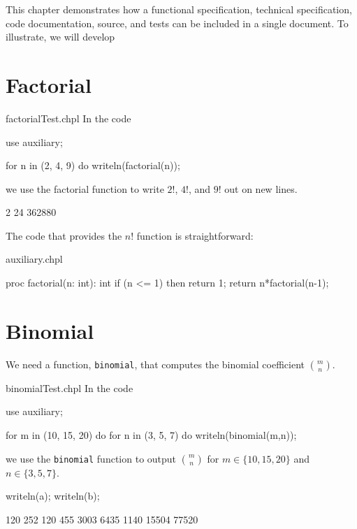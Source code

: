 \label{Example_Application}

This chapter demonstrates how a functional specification, technical specification, code documentation,
source, and tests can be included in a single document.  To illustrate, we will develop 

\section{Factorial}

\begin{chapelexample}{factorialTest.chpl}
In the code
\begin{chapelpre}
use auxiliary;
\end{chapelpre}
\begin{chapel}
for n in (2, 4, 9) do
  writeln(factorial(n));
\end{chapel}
we use the factorial function to write $2!$, $4!$, and $9!$ out on new lines.
\begin{chapelpost}
\end{chapelpost}
\begin{chapeloutput}
2
24
362880
\end{chapeloutput}
\end{chapelexample}

The code that provides the $n!$ function is straightforward:
\begin{chapelsource}{auxiliary.chpl}
\begin{chapel}
proc factorial(n: int): int{
  if (n <= 1) then return 1;
  return n*factorial(n-1);
}
\end{chapel}
\end{chapelsource}

\section{Binomial}

We need a function, \lstinline{binomial}, that computes the binomial coefficient $\binom{m}{n}$.
\begin{chapelexample}{binomialTest.chpl}
In the code
\begin{chapelpre}
use auxiliary;
\end{chapelpre}
\begin{chapel}
for m in (10, 15, 20) do {
  for n in (3, 5, 7) do {
    writeln(binomial(m,n));
  }
}
\end{chapel}
we use the \lstinline{binomial} function to output $\binom{m}{n}$ 
for $m\in\{10, 15, 20\}$ and $n \in \{3, 5, 7\}$.
\begin{chapelpost}
writeln(a);
writeln(b);
\end{chapelpost}
\begin{chapeloutput}
120
252
120
455
3003
6435
1140
15504
77520
\end{chapeloutput}
\end{chapelexample}

